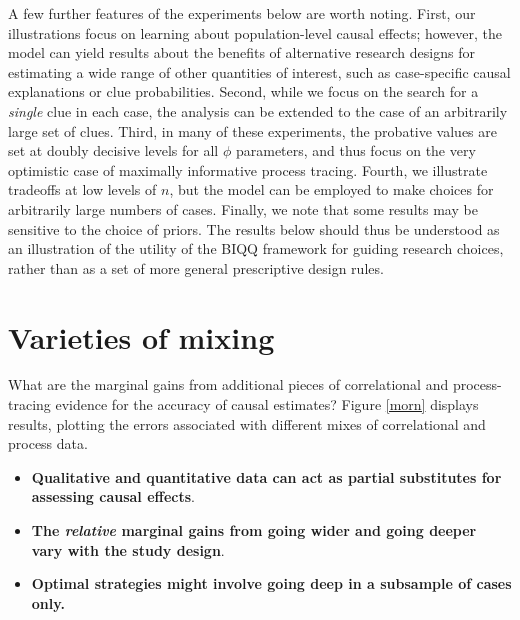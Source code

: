 \documentclass[12pt,]{book}
\providecommand{\tightlist}{%
  \setlength{\itemsep}{0pt}\setlength{\parskip}{0pt}}
\begin{document}
A few further features of the experiments below are worth noting. First, our illustrations focus on learning about population-level causal effects; however, the model can yield results about the benefits of alternative research designs for estimating a wide range of other quantities of interest, such as case-specific causal explanations or clue probabilities. Second, while we focus on the search for a \emph{single} clue in each case, the analysis can be extended to the case of an arbitrarily large set of clues. Third, in many of these experiments, the probative values are set at doubly decisive levels for all \(\phi\) parameters, and thus focus on the very optimistic case of maximally informative process tracing. Fourth, we illustrate tradeoffs at low levels of \(n\), but the model can be employed to make choices for arbitrarily large numbers of cases. Finally, we note that some results may be sensitive to the choice of priors. The results below should thus be understood as an illustration of the utility of the BIQQ framework for guiding research choices, rather than as a set of more general prescriptive design rules.

\hypertarget{varieties}{%
\section{Varieties of mixing}\label{varieties}}

What are the marginal gains from additional pieces of correlational and process-tracing evidence for the accuracy of causal estimates? Figure \ref{morn} displays results, plotting the errors associated with different mixes of correlational and process data.

\begin{itemize}
\tightlist
\item
  \textbf{Qualitative and quantitative data can act as partial substitutes for assessing causal effects}.
\item
  \textbf{The \emph{relative} marginal gains from going wider and going deeper vary with the study design}.
\item
  \textbf{Optimal strategies might involve going deep in a subsample of cases only.}
\end{itemize}
\end{document}
